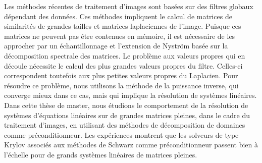 Les méthodes récentes de traitement d'images sont basées sur des filtres globaux dépendant des données.
Ces méthodes impliquent le calcul de matrices de similarités de grandes tailles et matrices laplaciennes de l'image.
Puisque ces matrices ne peuvent pas être contenues en mémoire, il est nécessaire de les approcher par un échantillonnage et l'extension de Nystr\"om basée sur la décomposition spectrale des matrices.
Le problème aux valeurs propres qui en découle nécessite le calcul des plus grandes valeurs propres du filtre.
Celles-ci correspondent toutefois aux plus petites valeurs propres du Laplacien.
Pour résoudre ce problème, nous utilisons la méthode de la puissance inverse, qui converge mieux dans ce cas, mais qui implique la résolution de systèmes linéaires.
Dans cette thèse de master, nous étudions le comportement de la résolution de systèmes d'équations linéaires sur de grandes matrices pleines, dans le cadre du traitement d'images, en utilisant des méthodes de décomposition de domaines comme préconditionneur.
Les expériences montrent que les solveurs de type Krylov associés aux méthodes de Schwarz comme préconditionneur passent bien à l'échelle pour de grands systèmes linéaires de matrices pleines.
